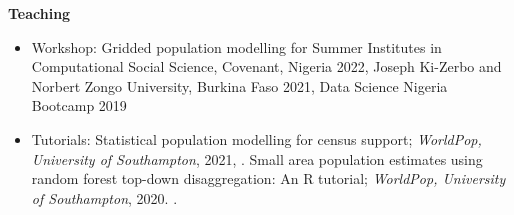 \documentclass[
]{friggeri-cv}
\begin{document}
\begin{noside}
\begin{itemize}

\end{itemize}


\textbf{Teaching}
\begin{itemize}
\item Workshop: Gridded population modelling for Summer Institutes in Computational Social Science, Covenant, Nigeria 2022, Joseph Ki-Zerbo and Norbert Zongo University, Burkina Faso 2021, Data Science Nigeria Bootcamp 2019

\item  Tutorials: Statistical population modelling for census support; \textit{WorldPop, University of Southampton}, 2021, \href{https://wpgp.github.io/bottom-up-tutorial/}{\scriptsize{}}. Small area population estimates using random forest top-down disaggregation: An R tutorial;   \textit{WorldPop, University of Southampton}, 2020. \href{https://htmlpreview.github.io/?https://github.com/wpgp/top-down-tutorial/blob/master/4_tutorial.html#Suggested_Citation}{\scriptsize{}}.


\end{itemize}
\end{noside}
\end{document}
